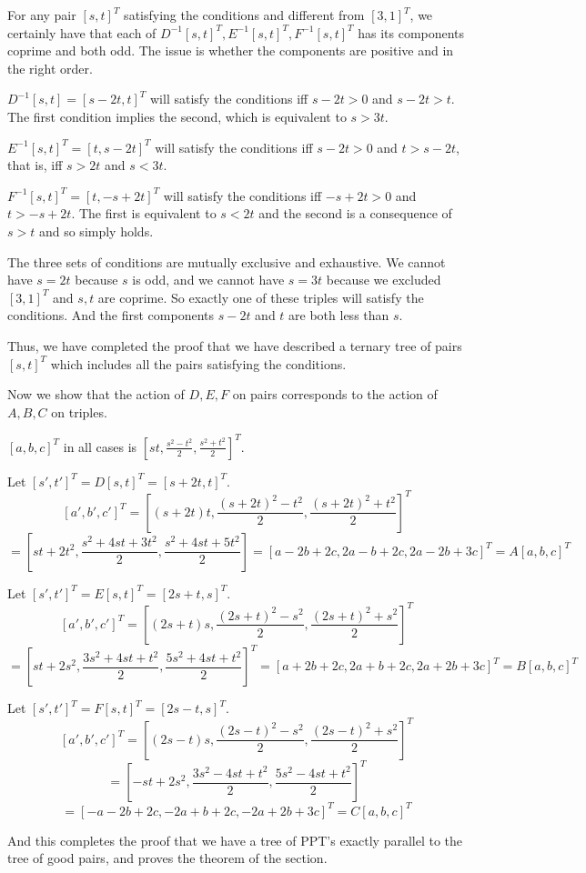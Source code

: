 \documentclass[12pt]{article}
\begin{document}
For any pair $[s,t]^T$ satisfying the conditions and different from $[3,1]^T$, we certainly have that each of $D^{-1}[s,t]^T, E^{-1}[s,t]^T,F^{-1}[s,t]^T$ has its components coprime and both odd.   The issue is whether the components are positive and in the right order.

$D^{-1}[s,t] = [s-2t,t]^T$ will satisfy the conditions iff $s-2t >0$ and $s-2t>t$.   The first condition implies the second, which is equivalent to $s>3t$.

$E^{-1}[s,t]^T = [t,s-2t]^T$ will satisfy the conditions iff $s-2t>0$ and $t>s-2t$, that is, iff $s>2t$ and $s<3t$.

$F^{-1}[s,t]^T = [t,-s+2t]^T$ will satisfy the conditions iff $-s+2t>0$ and $t>-s+2t$.   The first is equivalent to $s<2t$ and the second is a consequence of $s>t$ and so simply holds.

The three sets of conditions are mutually exclusive and exhaustive.   We cannot have $s=2t$ because $s$ is odd, and we cannot have $s=3t$ because we excluded $[3,1]^T$ and $s,t$ are coprime.  So exactly one of these triples will satisfy the conditions.   And the first components $s-2t$ and $t$ are both less than $s$.

Thus, we have completed the proof that we have described a ternary tree of pairs $[s,t]^T$ which includes all the pairs satisfying the conditions.

Now we show that the action of $D,E,F$ on pairs corresponds to the action of $A,B,C$ on triples.


$[a,b,c]^T$ in all cases is $[st,\frac{s^2-t^2}2,\frac{s^2+t^2}2]^T$.

Let $[s',t']^T = D[s,t]^T = [s+2t,t]^T$.   $$[a',b',c']^T = [(s+2t)t,\frac{(s+2t)^2-t^2}2,\frac{(s+2t)^2+t^2}2]^T $$ $$ = [st+2t^2,\frac{s^2+4st+3t^2}2,\frac{s^2+4st+5t^2}2]=[a-2b+2c,2a-b+2c,2a-2b+3c]^T = A[a,b,c]^T$$

Let $[s',t']^T = E[s,t]^T = [2s+t,s]^T$.   $$[a',b',c']^T = [(2s+t)s,\frac{(2s+t)^2-s^2}2,\frac{(2s+t)^2+s^2}2]^T $$ $$ = [st+2s^2,\frac{3s^2+4st+t^2}2,\frac{5s^2+4st+t^2}2]^T=[a+2b+2c,2a+b+2c,2a+2b+3c]^T = B[a,b,c]^T$$

Let $[s',t']^T = F[s,t]^T = [2s-t,s]^T$.   $$[a',b',c']^T = [(2s-t)s,\frac{(2s-t)^2-s^2}2,\frac{(2s-t)^2+s^2}2]^T $$ $$ = [-st+2s^2,\frac{3s^2-4st+t^2}2,\frac{5s^2-4st+t^2}2]^T$$ $$=[-a-2b+2c,-2a+b+2c,-2a+2b+3c]^T = C[a,b,c]^T$$

And this completes the proof that we have a tree of PPT's exactly parallel to the tree of good pairs, and proves the theorem of the section.
\end{document}

